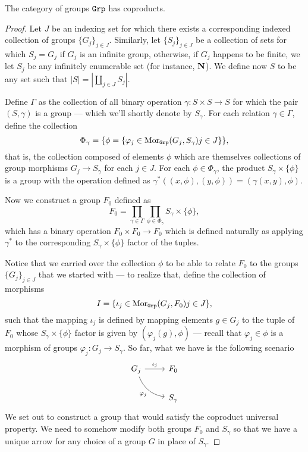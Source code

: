 \begin{proposition}
    \label{prop:coprod-grp}
    The category of groups \({\texttt{Grp}}\) has coproducts.
\end{proposition}

\begin{proof}
    Let \(J\) be an indexing set for which there exists a corresponding indexed
    collection of groups \(\{G_{j}\}_{j \in J}\). Similarly, let \(\{S_{j}\}_{j \in J}\)
    be a collection of sets for which \(S_j = G_j\) if \(G_j\) is an infinite group,
    otherwise, if \(G_j\) happens to be finite, we let \(S_j\) be any infinitely
    enumerable set (for instance, \(\mathbf{N}\)). We define now \(S\) to be any set such
    that \(|S| = |\coprod_{j \in J} S_{j}|\).

    Define \(\Gamma\) as the collection of all binary operation \(\gamma: S \times S
    \to S\) for which the pair \((S, \gamma)\) is a group --- which we'll shortly
    denote by \(S_{\gamma}\). For each relation \(\gamma \in \Gamma\), define the
    collection
    \[
        \Phi_{\gamma} =
        \{\phi = \{\varphi_{j} \in \operatorname{Mor}_{{\texttt{Grp}}}(G_j, S_\gamma) \relax j \in J\}\},
    \]
    that is, the collection composed of elements \(\phi\) which are themselves
    collections of group morphisms \(G_j \to S_\gamma\) for each \(j \in J\). For
    each \(\phi \in \Phi_{\gamma}\), the product \(S_{\gamma} \times \{\phi\}\) is a
    group with the operation defined as \(\gamma^{*}((x, \phi), (y, \phi)) =
    (\gamma(x, y), \phi)\).

    Now we construct a group \(F_0\) defined as
    \[
        F_0 = \prod_{\gamma \in \Gamma}
        \prod_{\phi \in \Phi_{\gamma}} S_{\gamma} \times \{\phi\},
    \]
    which has a binary operation \(F_0 \times F_0 \to F_0\) which is defined
    naturally as applying \(\gamma^{*}\) to the corresponding \(S_{\gamma} \times
    \{\phi\}\) factor of the tuples.

    Notice that we carried over the collection \(\phi\) to be able to relate \(F_0\)
    to the groups \(\{G_{j}\}_{j \in J}\) that we started with --- to realize that,
    define the collection of morphisms
    \[
        I = \{\iota_{j} \in \operatorname{Mor}_{{\texttt{Grp}}}(G_j, F_0) \relax j \in J\},
    \]
    such that the mapping \(\iota_j\) is defined by mapping elements \(g \in G_j\)
    to the tuple of \(F_0\) whose \(S_{\gamma} \times \{\phi\}\) factor is given by
    \((\varphi_j(g), \phi)\) --- recall that \(\varphi_j \in \phi\) is a morphism of
    groups \(\varphi_j: G_j \to S_{\gamma}\). So far, what we have is the following
    scenario
    \[
        \begin{tikzcd}
            G_j \ar[r, "\iota_j"] \ar[rd, bend right, swap, "\varphi_j"] &F_0 \\
            &S_\gamma
        \end{tikzcd}
    \]
    We set out to construct a group that would satisfy the coproduct universal
    property. We need to somehow modify both groups \(F_0\) and \(S_{\gamma}\) so
    that we have a unique arrow for any choice of a group \(G\) in place of
    \(S_{\gamma}\).


\end{proof}

